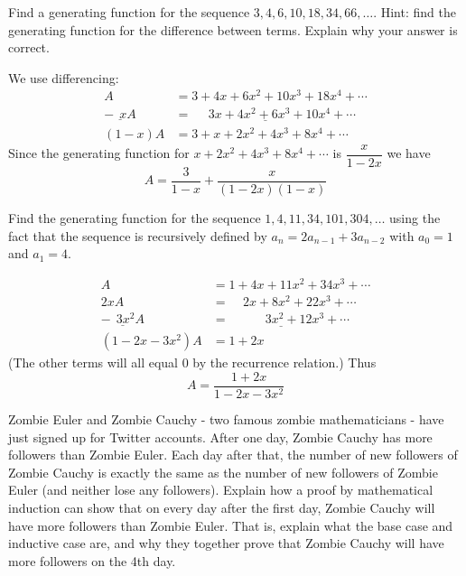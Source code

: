 \documentclass[11pt]{exam}
\begin{document}

\begin{questions}

\question[4] Find a generating function for the sequence $3, 4, 6, 10, 18, 34, 66, \ldots$.  Hint: find the generating function for the difference between terms. Explain why your answer is correct.
\begin{solution}
We use differencing:
  \begin{align*}
    A & = 3 + 4x + 6x^2 + 10x^3 + 18x^4 + \cdots \\
    \underline{ - ~~xA } & \underline{ = ~~~~~~ 3x + 4x^2 + 6x^3 + 10x^4 + \cdots }\\
    (1-x)A & = 3 + x + 2x^2 + 4x^3 + 8x^4 + \cdots
  \end{align*}
  Since the generating function for $x + 2x^2 + 4x^3 + 8x^4 + \cdots$ is $\dfrac{x}{1-2x}$ we have
  \[A = \frac{3}{1-x} + \frac{x}{(1-2x)(1-x)}\]
\end{solution}


\question[4] Find the generating function for the sequence $1, 4, 11, 34, 101, 304, \ldots$ using the fact that the sequence is recursively defined by $a_n = 2 a_{n-1} + 3a_{n-2}$ with $a_0 = 1$ and $a_1 = 4$.  

\begin{solution}
  \begin{align*}
    A & = 1 + 4x + 11x^2 + 34x^3 + \cdots \\
    2xA & = ~~~~~ 2x + 8x^2 + 22x^3 + \cdots \\
    \underline{- ~~ 3x^2A } & \underline{ = ~~~~~~~~~~~~~3x^2 + 12x^3 + \cdots} \\
    (1-2x-3x^2)A & = 1 + 2x
  \end{align*}
(The other terms will all equal 0 by the recurrence relation.)  Thus
\[A = \frac{1+2x}{1-2x-3x^2}\]
\end{solution}




\question[4] Zombie Euler and Zombie Cauchy - two famous zombie mathematicians - have just signed up for Twitter accounts.  After one day, Zombie Cauchy has more followers than Zombie Euler.  Each day after that, the number of new followers of Zombie Cauchy is exactly the same as the number of new followers of Zombie Euler (and neither lose any followers).  Explain how a proof by mathematical induction can show that on every day after the first day, Zombie Cauchy will have more followers than Zombie Euler.  That is, explain what the base case and inductive case are, and why they together prove that Zombie Cauchy will have more followers on the 4th day.


\end{questions}
\end{document}
